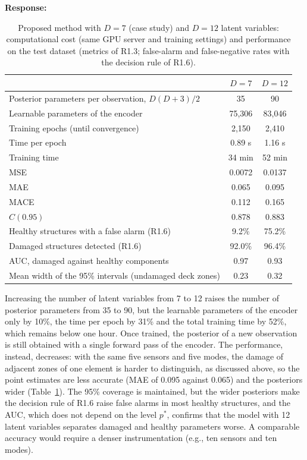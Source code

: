 \documentclass[11pt]{article}
\newenvironment{response}{\par\smallskip\noindent\color{resp}\textbf{Response:}\ }{\par}
\begin{document}
\begin{response}
\begin{table}[H]
\centering\small
\caption{Proposed method with $D=7$ (case study) and $D=12$ latent variables: computational cost (same GPU server and
training settings) and performance on the test dataset (metrics of R1.3; false-alarm and false-negative rates with the decision rule of R1.6).}
\label{tab:scal}
\begin{tabular}{lcc}
\toprule
 & $D=7$ & $D=12$ \\
\midrule
Posterior parameters per observation, $D(D+3)/2$ & 35 & 90 \\
Learnable parameters of the encoder & 75,306 & 83,046 \\
Training epochs (until convergence) & 2,150 & 2,410 \\
Time per epoch & 0.89 s & 1.16 s \\
Training time & 34 min & 52 min \\
\midrule
MSE & 0.0072 & 0.0137 \\
MAE & 0.065 & 0.095 \\
MACE & 0.112 & 0.165 \\
$C(0.95)$ & 0.878 & 0.883 \\
Healthy structures with a false alarm (R1.6) & 9.2\% & 75.2\% \\
Damaged structures detected (R1.6) & 92.0\% & 96.4\% \\
AUC, damaged against healthy components & 0.97 & 0.93 \\
Mean width of the 95\% intervals (undamaged deck zones) & 0.23 & 0.32 \\
\bottomrule
\end{tabular}
\end{table}

Increasing the number of latent variables from 7 to 12 raises the number of posterior parameters from 35 to 90, but the
learnable parameters of the encoder only by 10\%, the time per epoch by 31\% and the total training time by 52\%, which
remains below one hour. Once trained, the posterior of a new observation is still obtained with a single forward pass of
the encoder. The performance, instead, decreases: with the same five sensors and five modes, the damage of adjacent
zones of one element is harder to distinguish, as discussed above, so the point estimates are less accurate (MAE of
0.095 against 0.065) and the posteriors wider (Table~\ref{tab:scal}). The 95\% coverage is maintained, but the wider
posteriors make the decision rule of R1.6 raise false alarms in most healthy structures, and the AUC, which does not
depend on the level $p^*$, confirms that the model with 12 latent variables separates damaged and
healthy parameters worse. A comparable accuracy would require a denser
instrumentation (e.g., ten sensors and ten modes).


\end{response}
\end{document}
